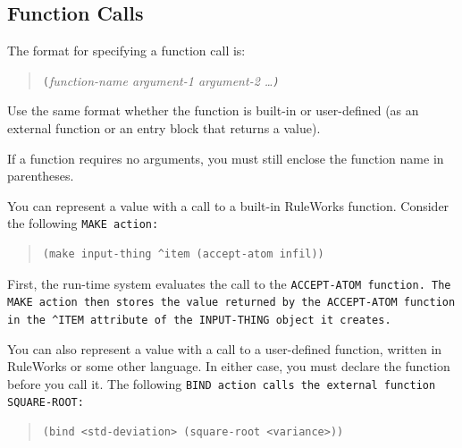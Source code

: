 \subsection{Function Calls}

The format for specifying a function call is:

\begin{quote}
  \verb|(|\it{function-name} \it{argument-1} \it{argument-2} \ldots\verb|)|
\end{quote}

Use the same format whether the function is built-in or user-defined
(as an external function or an entry block that returns a value).

\begin{note}
  If a function requires no arguments, you must still enclose the
  function name in parentheses.
\end{note}

You can represent a value with a call to a built-in RuleWorks
function. Consider the following \tt{MAKE} action:

\begin{quote}
\begin{verbatim}
(make input-thing ^item (accept-atom infil))
\end{verbatim}
\end{quote}

First, the run-time system evaluates the call to the \tt{ACCEPT-ATOM}
function. The \tt{MAKE} action then stores the value returned by the
\tt{ACCEPT-ATOM} function in the \verb|^ITEM| attribute of the
\tt{INPUT-THING} object it creates.

You can also represent a value with a call to a user-defined function,
written in RuleWorks or some other language. In either case, you must
declare the function before you call it. The following \tt{BIND}
action calls the external function \verb|SQUARE-ROOT|:

\begin{quote}
\begin{verbatim}
(bind <std-deviation> (square-root <variance>))
\end{verbatim}
\end{quote}

